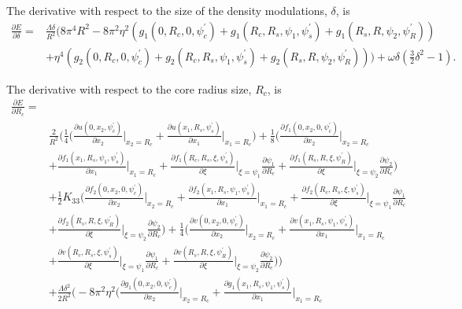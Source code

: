 \documentclass[12pt]{article}
\begin{document}
The derivative with respect to the size of the density modulations, $\delta$, is
\begin{align}
\frac{\partial E}{\partial \delta}=&\frac{\Lambda\delta}{R^2}\big(8\pi^4R^2-8\pi^2\eta^2(g_1(0,R_c,0,\psi_c^{\prime})+g_1(R_c,R_s,\psi_1,\psi_s^{\prime})+g_1(R_s,R,\psi_2,\psi_R^{\prime}))\nonumber\\
&+\eta^4(g_2(0,R_c,0,\psi_c^{\prime})+g_2(R_c,R_s,\psi_1,\psi_s^{\prime})+g_2(R_s,R,\psi_2,\psi_R^{\prime}))\big)+\omega\delta\left(\frac{3}{2}\delta^2-1\right).
\end{align}

The derivative with respect to the core radius size, $R_c$, is
\begin{align}
\frac{\partial E}{\partial R_c}=&\nonumber\\
&\frac{2}{R^2}\bigg(\frac{1}{4}\bigg(\frac{\partial u(0,x_2,\psi_c^{\prime})}{\partial x_2}\bigg|_{x_2=R_c}+\frac{\partial u(x_1,R_s,\psi_s^{\prime})}{\partial x_1}\bigg|_{x_1=R_c}\bigg)+\frac{1}{8}\bigg(\frac{\partial f_1(0,x_2,0,\psi_c^{\prime})}{\partial x_2}\bigg|_{x_2=R_c}\nonumber\\
&+\frac{\partial f_1(x_1,R_s,\psi_1,\psi_s^{\prime})}{\partial x_1}\bigg|_{x_1=R_c}+\frac{\partial f_1(R_c,R_s,\xi,\psi_s^{\prime})}{\partial \xi}\bigg|_{\xi=\psi_1}\frac{\partial \psi_1}{\partial R_c}+\frac{\partial f_1(R_s,R,\xi,\psi_R^{\prime})}{\partial \xi}\bigg|_{\xi=\psi_2}\frac{\partial \psi_2}{\partial R_c}\bigg)\nonumber\\
&+\frac{1}{2}K_{33}\bigg(\frac{\partial f_2(0,x_2,0,\psi_c^{\prime})}{\partial x_2}\bigg|_{x_2=R_c}+\frac{\partial f_2(x_1,R_s,\psi_1,\psi_s^{\prime})}{\partial x_1}\bigg|_{x_1=R_c}+\frac{\partial f_2(R_c,R_s,\xi,\psi_s^{\prime})}{\partial \xi}\bigg|_{\xi=\psi_1}\frac{\partial \psi_1}{\partial R_c}\nonumber\\
&+\frac{\partial f_2(R_s,R,\xi,\psi_R^{\prime})}{\partial \xi}\bigg|_{\xi=\psi_2}\frac{\partial \psi_2}{\partial R_c}\bigg)+\frac{1}{4}\bigg(\frac{\partial v(0,x_2,0,\psi_c^{\prime})}{\partial x_2}\bigg|_{x_2=R_c}+\frac{\partial v(x_1,R_s,\psi_1,\psi_s^{\prime})}{\partial x_1}\bigg|_{x_1=R_c}\nonumber\\
&+\frac{\partial v(R_c,R_s,\xi,\psi_s^{\prime})}{\partial \xi}\bigg|_{\xi=\psi_1}\frac{\partial\psi_1}{\partial R_c}+\frac{\partial v(R_s,R,\xi,\psi_R^{\prime})}{\partial \xi}\bigg|_{\xi=\psi_2}\frac{\partial\psi_2}{\partial R_c}\bigg)\bigg)\nonumber\\
&+\frac{\Lambda\delta^2}{2R^2}\bigg(-8\pi^2\eta^2\bigg(\frac{\partial g_1(0,x_2,0,\psi_c^{\prime})}{\partial x_2}\bigg|_{x_2=R_c}+\frac{\partial g_1(x_1,R_s,\psi_1,\psi_s^{\prime})}{\partial x_1}\bigg|_{x_1=R_c}\nonumber\\

\end{align}
\end{document}
